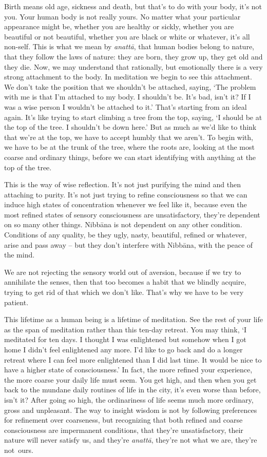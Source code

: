 Birth means old age, sickness and death, but that's to do with your body, it's not you. Your human body is not really yours. No matter what your particular appearance might be, whether you are healthy or sickly, whether you are beautiful or not beautiful, whether you are black or white or whatever, it's all non-self. This is what we mean by \textit{anatt\=a}, that human bodies belong to nature, that they follow the laws of nature: they are born, they grow up, they get old and they die. Now, we may understand that rationally, but emotionally there is a very strong attachment to the body. In meditation we begin to see this attachment. We don't take the position that we shouldn't be attached, saying, `The problem with me is that I'm attached to my body. I shouldn't be. It's bad, isn't it? If I was a wise person I wouldn't be attached to it.' That's starting from an ideal again. It's like trying to start climbing a tree from the top, saying, `I should be at the top of the tree. I shouldn't be down here.' But as much as we'd like to think that we're at the top, we have to accept humbly that we aren't. To begin with, we have to be at the trunk of the tree, where the roots are, looking at the most coarse and ordinary things, before we can start identifying with anything at the top of the tree.

This is the way of wise reflection. It's not just purifying the mind and then attaching to purity. It's not just trying to refine consciousness so that we can induce high states of concentration whenever we feel like it, because even the most refined states of sensory consciousness are unsatisfactory, they're dependent on so many other things. Nibb\=ana is not dependent on any other condition. Conditions of any quality, be they ugly, nasty, beautiful, refined or whatever, arise and pass away -- but they don't interfere with Nibb\=ana, with the peace of the mind.

We are not rejecting the sensory world out of aversion, because if we try to annihilate the senses, then that too becomes a habit that we blindly acquire, trying to get rid of that which we don't like. That's why we have to be very patient.

This lifetime as a human being is a lifetime of meditation. See the rest of your life as the span of meditation rather than this ten-day retreat. You may think, `I meditated for ten days. I thought I was enlightened but somehow when I got home I didn't feel enlightened any more. I'd like to go back and do a longer retreat where I can feel more enlightened than I did last time. It would be nice to have a higher state of consciousness.' In fact, the more refined your experience, the more coarse your daily life must seem. You get high, and then when you get back to the mundane daily routines of life in the city, it's even worse than before, isn't it? After going so high, the ordinariness of life seems much more ordinary, gross and unpleasant. The way to insight wisdom is not by following preferences for refinement over coarseness, but recognizing that both refined and coarse consciousness are impermanent conditions, that they're unsatisfactory, their nature will never \mbox{satisfy} us, and they're \textit{anatt\=a}, they're not what we are, they're not~ours.

